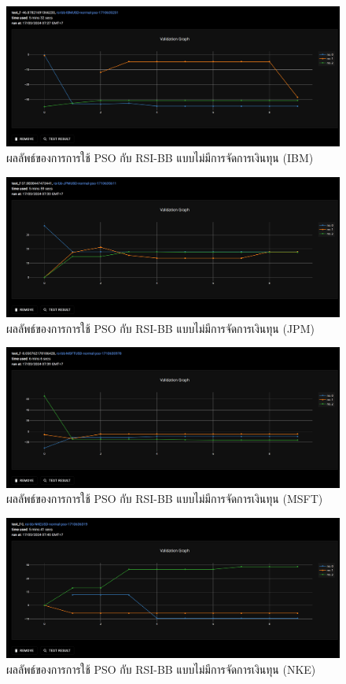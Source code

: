 \begin{figure}[ht]
    \centering
    \includegraphics[width=\textwidth]{images/pso/rsi-bb/ibm-normal.png}
    \caption{ผลลัพธ์ของการการใช้ PSO กับ RSI-BB แบบไม่มีการจัดการเงินทุน (IBM)}
\end{figure}
\begin{figure}[ht]
    \centering
    \includegraphics[width=\textwidth]{images/pso/rsi-bb/jpm-normal.png}
    \caption{ผลลัพธ์ของการการใช้ PSO กับ RSI-BB แบบไม่มีการจัดการเงินทุน (JPM)}
\end{figure}
\begin{figure}[ht]
    \centering
    \includegraphics[width=\textwidth]{images/pso/rsi-bb/msft-normal.png}
    \caption{ผลลัพธ์ของการการใช้ PSO กับ RSI-BB แบบไม่มีการจัดการเงินทุน (MSFT)}
\end{figure}
\begin{figure}[ht]
    \centering
    \includegraphics[width=\textwidth]{images/pso/rsi-bb/nke-normal.png}
    \caption{ผลลัพธ์ของการการใช้ PSO กับ RSI-BB แบบไม่มีการจัดการเงินทุน (NKE)}
\end{figure}
